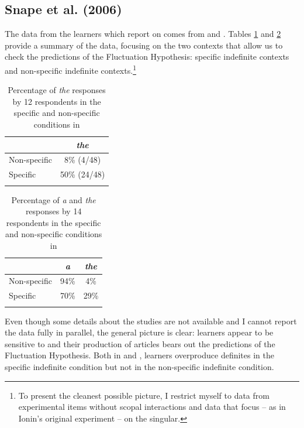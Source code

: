 \documentclass[output=paper,
modfonts
]{langscibook}
\begin{document}
\subsection{Snape et al. (2006)}\label{sec:lebruyn:3-1}\largerpage[2]

The data from the  learners which \citet{SnapeLeungTing2006} report on comes from \citet{Hawkinsetal2006} and \citet{Reidetal2006}. Tables \ref{tab:lebruyn:3} and \ref{tab:lebruyn:4} provide a summary of the data, focusing on the two contexts that allow us to check the predictions of the Fluctuation Hypothesis: specific indefinite contexts and non-specific indefinite contexts.\footnote{To present the cleanest possible picture, I restrict myself to data from experimental items without scopal interactions and data that focus -- as in Ionin’s original experiment – on the singular.}

\begin{table}[h]
\begin{tabular}{lc}
\lsptoprule
 &  \textit{the} \\
\midrule
Non-specific & 8\% (4/48) \\
Specific & 50\% (24/48) \\
\lspbottomrule
\end{tabular}
\caption{Percentage of \textit{the} responses by 12  respondents in the specific and non-specific conditions in \citet{Hawkinsetal2006}}
\label{tab:lebruyn:3}
\end{table}

\begin{table}[h]
\begin{tabular}{lcc}
\lsptoprule
 & \textit{a} & \textit{the} \\
\midrule
{Non-specific} & 94\% & \phantom{2}4\%  \\
Specific & 70\% & 29\% \\
\lspbottomrule
\end{tabular}
\caption{Percentage of \textit{a} and \textit{the} responses by 14  respondents in the specific and non-specific conditions in \citet{Reidetal2006}}
\label{tab:lebruyn:4}
\end{table}\pagebreak

Even though some details about the studies are not available and I cannot report the data fully in parallel, the general picture is clear:  learners appear to be sensitive to  and their production of  articles bears out the predictions of the Fluctuation Hypothesis. Both in \citet{Hawkinsetal2006} and \citet{Reidetal2006},  learners overproduce definites in the specific indefinite condition but not in the non-specific indefinite condition.
\end{document}
